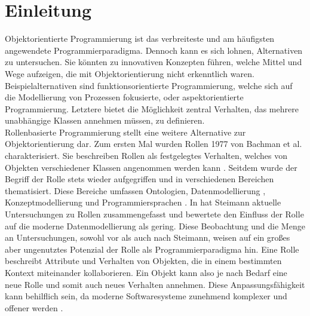 \documentclass[conference]{IEEEtran}
\begin{document}
\section{Einleitung}
Objektorientierte Programmierung ist das verbreiteste und am häufigsten angewendete Programmierparadigma. Dennoch kann es sich lohnen, Alternativen zu untersuchen. Sie könnten zu innovativen Konzepten führen, welche Mittel und Wege aufzeigen, die mit Objektorientierung nicht erkenntlich waren. Beispielalternativen sind funktionsorientierte Programmierung, welche sich auf die Modellierung von Prozessen fokusierte, oder aspektorientierte Programmierung. Letztere bietet die Möglichkeit zentral Verhalten, das mehrere unabhängige Klassen annehmen müssen, zu definieren. \\ Rollenbasierte Programmierung stellt eine weitere Alternative zur Objektorientierung dar. Zum ersten Mal wurden Rollen 1977 von Bachman et al. charakterisiert. Sie beschreiben Rollen als festgelegtes Verhalten, welches von Objekten verschiedener Klassen angenommen werden kann \cite{bachman}. Seitdem wurde der Begriff der Rolle stets wieder aufgegriffen und in verschiedenen Bereichen thematisiert. Diese Bereiche umfassen Ontologien\cite{loebe2005abstract}\cite{guarino2009overview}, Datenmodellierung \cite{halpin2005orm}, Konzeptmodellierung \cite{hennicker2015model} und Programmiersprachen \cite{ubayashi2000roleep}. In \cite{steimann2000representation} hat Steimann aktuelle Untersuchungen zu Rollen zusammengefasst und bewertete den Einfluss der Rolle auf die moderne Datenmodellierung als gering. Diese Beobachtung und die Menge an Untersuchungen, sowohl vor als auch nach Steimann, weisen auf ein großes aber ungenutztes Potenzial der Rolle als Programmierparadigma hin. Eine Rolle beschreibt Attribute und Verhalten von Objekten, die in einem bestimmten Kontext miteinander kollaborieren. Ein Objekt kann also je nach Bedarf eine neue Rolle und somit auch neues Verhalten annehmen. Diese Anpassungsfähigkeit kann behilflich sein, da moderne Softwaresysteme zunehmend komplexer und offener werden \cite{murer2008managed}. \\
\end{document}
